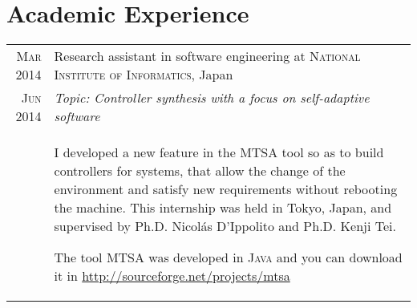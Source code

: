 \section{Academic Experience}
\begin{tabular}{r|p{11cm}}

  \textsc{Mar 2014} & Research assistant in software engineering at \textsc{National Institute of Informatics}, Japan \\
  \textsc{Jun 2014} &\emph{Topic: Controller synthesis with a focus on self-adaptive software}\\
  &\footnotesize{I developed a new feature  in the MTSA tool so as to build controllers for systems, that allow the
  change of the environment and satisfy new requirements without rebooting the machine. This internship was held in
  Tokyo, Japan, and supervised by Ph.D. Nicolás D'Ippolito and Ph.D. Kenji Tei.
  
  The tool MTSA was developed in \textsc{Java} and you can download it in \url{http://sourceforge.net/projects/mtsa}} \\

\end{tabular}

